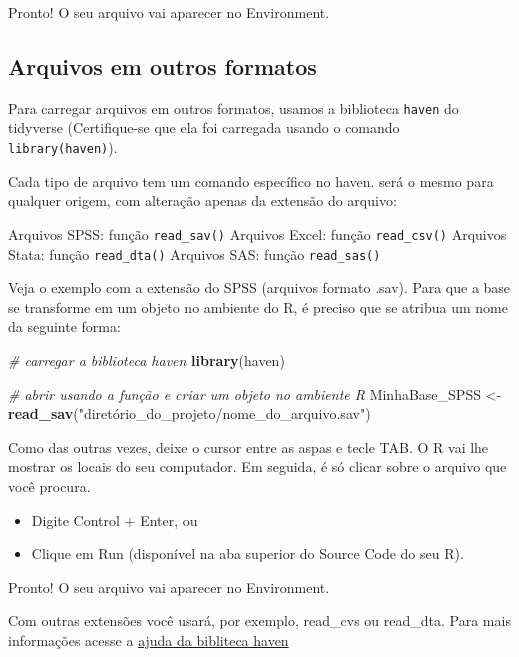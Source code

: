 \documentclass[
  brazil,
]{book}
\newenvironment{Shaded}{\begin{snugshade}}{\end{snugshade}}
\newcommand{\CommentTok}[1]{\textcolor[rgb]{0.56,0.35,0.01}{\textit{#1}}}
\newcommand{\KeywordTok}[1]{\textcolor[rgb]{0.13,0.29,0.53}{\textbf{#1}}}
\newcommand{\NormalTok}[1]{#1}
\newcommand{\StringTok}[1]{\textcolor[rgb]{0.31,0.60,0.02}{#1}}
\providecommand{\tightlist}{%
  \setlength{\itemsep}{0pt}\setlength{\parskip}{0pt}}
\begin{document}
Pronto! O seu arquivo vai aparecer no Environment.

\hypertarget{arquivos-em-outros-formatos-1}{%
\subsection{Arquivos em outros formatos}\label{arquivos-em-outros-formatos-1}}

Para carregar arquivos em outros formatos, usamos a biblioteca \texttt{haven} do tidyverse (Certifique-se que ela foi carregada usando o comando \texttt{library(haven)}).

Cada tipo de arquivo tem um comando específico no haven. será o mesmo para qualquer origem, com alteração apenas da extensão do arquivo:

Arquivos SPSS: função \texttt{read\_sav()}
Arquivos Excel: função \texttt{read\_csv()}
Arquivos Stata: função \texttt{read\_dta()}
Arquivos SAS: função \texttt{read\_sas()}

Veja o exemplo com a extensão do SPSS (arquivos formato .sav). Para que a base se transforme em um objeto no ambiente do R, é preciso que se atribua um nome da seguinte forma:

\begin{Shaded}
\begin{Highlighting}[]
\CommentTok{# carregar a biblioteca haven}
\KeywordTok{library}\NormalTok{(haven)}

\CommentTok{# abrir usando a função e criar um objeto no ambiente R}
\NormalTok{MinhaBase_SPSS <-}\StringTok{ }\KeywordTok{read_sav}\NormalTok{(}\StringTok{"diretório_do_projeto/nome_do_arquivo.sav"}\NormalTok{)}
\end{Highlighting}
\end{Shaded}

Como das outras vezes, deixe o cursor entre as aspas e tecle TAB. O R vai lhe mostrar os locais do seu computador. Em seguida, é só clicar sobre o arquivo que você procura.

\begin{itemize}
\tightlist
\item
  Digite Control + Enter, ou
\item
  Clique em Run (disponível na aba superior do Source Code do seu R).
\end{itemize}

Pronto! O seu arquivo vai aparecer no Environment.

Com outras extensões você usará, por exemplo, read\_cvs ou read\_dta. Para mais informações acesse a \href{https://haven.tidyverse.org/}{ajuda da bibliteca haven}
\end{document}
